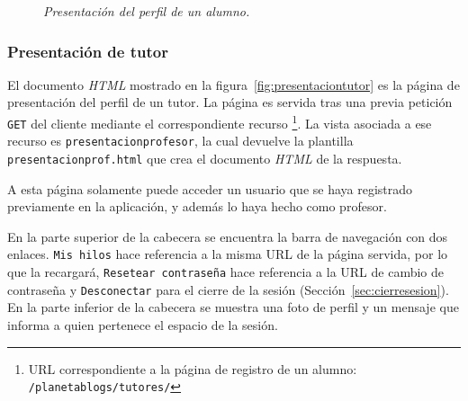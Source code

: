 \documentclass[a4paper, 12pt]{book}
\begin{document}
\begin{figure}
  \centering
  \caption{\textit{Presentaci\'on del perfil de un alumno.}}
  \label{fig:presentacionalumno}
\end{figure}


\subsubsection{Presentaci\'on de tutor}
\label{sec:presentaciontutor}
El documento \textit{HTML} mostrado en la figura~\ref{fig:presentaciontutor} es la p\'agina de presentaci\'on del perfil de un tutor. La p\'agina es servida 
tras una previa petici\'on \texttt{GET} del cliente mediante el correspondiente recurso \footnote{URL correspondiente a la p\'agina de registro de un alumno: 
\texttt{/planetablogs/tutores/}}. La vista asociada a ese recurso es \texttt{presentacionprofesor}, la cual devuelve la plantilla 
\texttt{presentacionprof.html} que crea el documento \textit{HTML} de la respuesta.

A esta p\'agina solamente puede acceder un usuario que se haya registrado previamente en la aplicaci\'on, y adem\'as lo haya hecho como profesor.

En la parte superior de la cabecera se encuentra la barra de navegaci\'on con dos enlaces. \texttt{Mis hilos} hace referencia a la misma URL de la 
p\'agina servida, por lo que la recargar\'a, \texttt{Resetear contrase\~na} hace referencia a la URL de cambio de contrase\~na y \texttt{Desconectar} para el cierre de la sesi\'on (Secci\'on~\ref{sec:cierresesion}). En la parte inferior 
de la cabecera se muestra una foto de perfil y un mensaje que informa a quien pertenece el espacio de la sesi\'on.
\end{document}
